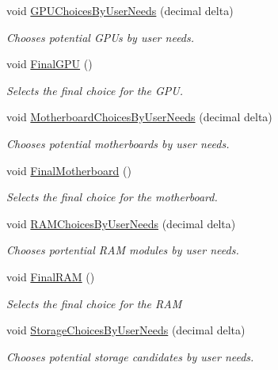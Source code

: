 \begin{DoxyCompactItemize}
void \hyperlink{class_business_logic_1_1_build_processor_a4d2c79f0219c32564dc53fbbeeb05a73}{G\+P\+U\+Choices\+By\+User\+Needs} (decimal delta)
\begin{DoxyCompactList}\small\item\em Chooses potential G\+P\+Us by user needs. \end{DoxyCompactList}\item 
void \hyperlink{class_business_logic_1_1_build_processor_a2ff04ad18300ae7465005574d0e48772}{Final\+G\+PU} ()
\begin{DoxyCompactList}\small\item\em Selects the final choice for the G\+PU. \end{DoxyCompactList}\item 
void \hyperlink{class_business_logic_1_1_build_processor_a8a8561de9ecd2966034c7a6a69611333}{Motherboard\+Choices\+By\+User\+Needs} (decimal delta)
\begin{DoxyCompactList}\small\item\em Chooses potential motherboards by user needs. \end{DoxyCompactList}\item 
void \hyperlink{class_business_logic_1_1_build_processor_a36b321cf0c93184ab607d7e07993c505}{Final\+Motherboard} ()
\begin{DoxyCompactList}\small\item\em Selects the final choice for the motherboard. \end{DoxyCompactList}\item 
void \hyperlink{class_business_logic_1_1_build_processor_a081f81558d48b97bb26290255aaf57eb}{R\+A\+M\+Choices\+By\+User\+Needs} (decimal delta)
\begin{DoxyCompactList}\small\item\em Chooses portential R\+AM modules by user needs. \end{DoxyCompactList}\item 
void \hyperlink{class_business_logic_1_1_build_processor_a0db9fed50e7a97ad28e59808242126a2}{Final\+R\+AM} ()
\begin{DoxyCompactList}\small\item\em Selects the final choice for the R\+AM \end{DoxyCompactList}\item 
void \hyperlink{class_business_logic_1_1_build_processor_a6548ea5bfcc8e7f9977c7fa7bd5c75a9}{Storage\+Choices\+By\+User\+Needs} (decimal delta)
\begin{DoxyCompactList}\small\item\em Chooses potential storage candidates by user needs. \end{DoxyCompactList}\item 

\end{DoxyCompactItemize}
